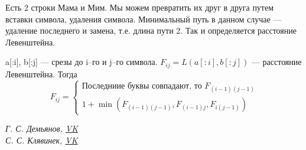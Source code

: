 \documentclass[a4paper,12pt]{article}
\theoremstyle{plain} %
\theoremstyle{definition} %
\theoremstyle{remark} %
\begin{document}
Есть 2 строки Мама и Мим. Мы можем превратить их друг в друга путем вставки символа, удаления символа. Минимальный путь в данном случае --- удаление последнего и замена, т.е. длина пути 2. Так и определяется расстояние Левенштейна.

a[:i], b[:j] --- срезы до i--го и j--го символа.
$F_{ij} = L(a[:i], b[:j])$ --- расстояние Левенштейна. Тогда\\
$$F_{ij}=
\begin{cases}
\text{Последниие буквы совпадают, то } F_{(i-1)(j-1)}\\
1+\min(F_{(i-1)(j-1)}, F_{(i-1)j}, F_{i(j-1)})
\end{cases}
$$






















\begin{center}
	\vfill \emph{{\small Г. С. Демьянов, \href{https://vk.com/id37346992}{VK}\\
С. С. Клявинек, \href{https://vk.com/id85132547}{VK}
}}
\end{center}
\end{document}
